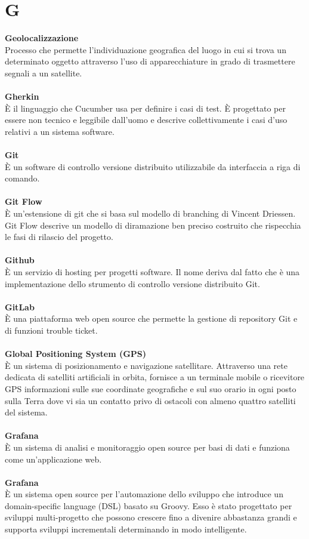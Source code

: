 \section{G}
\textbf{Geolocalizzazione}\\
Processo che permette l'individuazione geografica del luogo in cui si trova un determinato oggetto attraverso l'uso di apparecchiature in grado di trasmettere segnali a un satellite. \\ \\
\textbf{Gherkin}\\
È il linguaggio che Cucumber usa per definire i casi di test. È progettato per essere non tecnico e leggibile dall'uomo e descrive collettivamente i casi d'uso relativi a un sistema software. \\ \\
\textbf{Git}\\
È un software di controllo versione distribuito utilizzabile da interfaccia a riga di comando. \\ \\
\textbf{Git Flow}\\
È un’estensione di git che si basa sul modello di branching di Vincent Driessen. Git Flow descrive un modello di diramazione ben preciso costruito che rispecchia le fasi di rilascio del progetto.\\ \\
\textbf{Github}\\
È un servizio di hosting per progetti software. Il nome deriva dal fatto che è una implementazione dello strumento di controllo versione distribuito Git. \\ \\
\textbf{GitLab}\\
È una piattaforma web open source che permette la gestione di repository Git e di funzioni trouble ticket. \\ \\
\textbf{Global Positioning System (GPS)}\\
È un sistema di posizionamento e navigazione satellitare. Attraverso una rete dedicata di satelliti artificiali in orbita, fornisce a un terminale mobile o ricevitore GPS informazioni sulle sue coordinate geografiche e sul suo orario in ogni posto sulla Terra dove vi sia un contatto privo di ostacoli con almeno quattro satelliti del sistema. \\ \\
\textbf{Grafana}\\
È un sistema di analisi e monitoraggio open source per basi di dati e funziona come un'applicazione web. \\ \\
\textbf{Grafana}\\ 
È un sistema open source per l'automazione dello sviluppo che introduce un domain-specific language (DSL) basato su Groovy. Esso è  stato progettato per sviluppi multi-progetto 
che possono crescere fino a divenire abbastanza grandi e supporta sviluppi incrementali determinando in modo intelligente. \\ \\

\clearpage